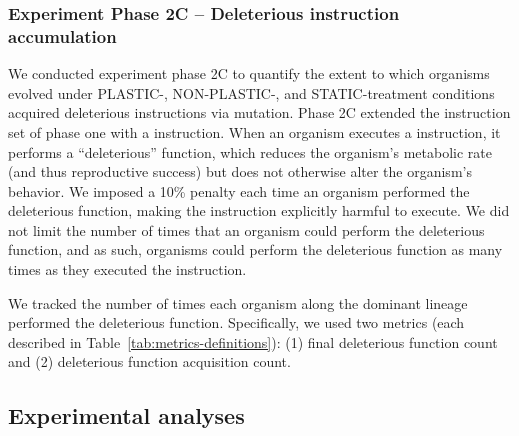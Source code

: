 \documentclass[utf8]{frontiersSCNS} %
\begin{document}
\begin{raggedbottom}
\subsubsection{Experiment Phase 2C -- Deleterious instruction accumulation}
\label{sec:methods:exp:deleterious-instruction-accumulation}

We conducted experiment phase 2C to quantify the extent to which organisms evolved under PLASTIC-, NON-PLASTIC-, and STATIC-treatment conditions acquired deleterious instructions via mutation.
Phase 2C extended the instruction set of phase one with a  instruction.
When an organism executes a  instruction, it performs a ``deleterious'' function, which reduces the organism's metabolic rate (and thus reproductive success) but does not otherwise alter the organism's behavior.
We imposed a 10\% penalty each time an organism performed the deleterious function, making the  instruction explicitly harmful to execute.
We did not limit the number of times that an organism could perform the deleterious function, and as such, organisms could perform the deleterious function as many times as they executed the  instruction.

We tracked the number of times each organism along the dominant lineage performed the deleterious function.
Specifically, we used two metrics (each described in Table~\ref{tab:metrics-definitions}):
(1) final deleterious function count and (2) deleterious function acquisition count.

\subsection{Experimental analyses}

\newcommand*{\thead}[1]{\multicolumn{1}{c}{\bfseries #1}}

\setlength{\tabcolsep}{16pt}
\renewcommand{\arraystretch}{1.5}
\begin{table}[ht]
    \centering


\end{table}
\end{raggedbottom}
\end{document}
